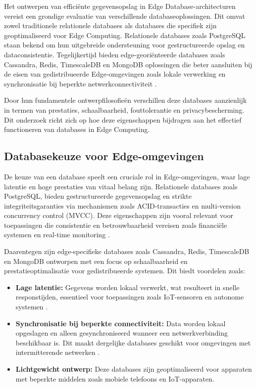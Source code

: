 Het ontwerpen van efficiënte gegevensopslag in Edge Database-architecturen vereist een grondige evaluatie van verschillende databaseoplossingen. Dit omvat zowel traditionele relationele databases als databases die specifiek zijn geoptimaliseerd voor Edge Computing. Relationele databases zoals PostgreSQL staan bekend om hun uitgebreide ondersteuning voor gestructureerde opslag en dataconsistentie. Tegelijkertijd bieden edge-georiënteerde databases zoals Cassandra, Redis, TimescaleDB en MongoDB oplossingen die beter aansluiten bij de eisen van gedistribueerde Edge-omgevingen zoals lokale verwerking en synchronisatie bij beperkte netwerkconnectiviteit \autocite{Kleppmann2017, Taheri2020, Rahmani2018}.

Door hun fundamentele ontwerpfilosofieën verschillen deze databases aanzienlijk in termen van prestaties, schaalbaarheid, fouttolerantie en privacybescherming. Dit onderzoek richt zich op hoe deze eigenschappen bijdragen aan het effectief functioneren van databases in Edge Computing.

\subsection{Databasekeuze voor Edge-omgevingen}

De keuze van een database speelt een cruciale rol in Edge-omgevingen, waar lage latentie en hoge prestaties van vitaal belang zijn. Relationele databases zoals PostgreSQL, bieden gestructureerde gegevensopslag en strikte integriteitsgaranties via mechanismen zoals ACID-transacties en multi-version concurrency control (MVCC). Deze eigenschappen zijn vooral relevant voor toepassingen die consistentie en betrouwbaarheid vereisen zoals financiële systemen en real-time monitoring \autocite{Kleppmann2017}.

Daarentegen zijn edge-specifieke databases zoals Cassandra, Redis, TimescaleDB en MongoDB ontworpen met een focus op schaalbaarheid en prestatieoptimalisatie voor gedistribueerde systemen. Dit biedt voordelen zoals:
\begin{itemize}
    \item \textbf{Lage latentie:} Gegevens worden lokaal verwerkt, wat resulteert in snelle responstijden, essentieel voor toepassingen zoals IoT-sensoren en autonome systemen \autocite{Taheri2020}.
    \item \textbf{Synchronisatie bij beperkte connectiviteit:} Data worden lokaal opgeslagen en alleen gesynchroniseerd wanneer een netwerkverbinding beschikbaar is. Dit maakt dergelijke databases geschikt voor omgevingen met intermitterende netwerken \autocite{Rahmani2018}.
    \item \textbf{Lichtgewicht ontwerp:} Deze databases zijn geoptimaliseerd voor apparaten met beperkte middelen zoals mobiele telefoons en IoT-apparaten.
\end{itemize}


